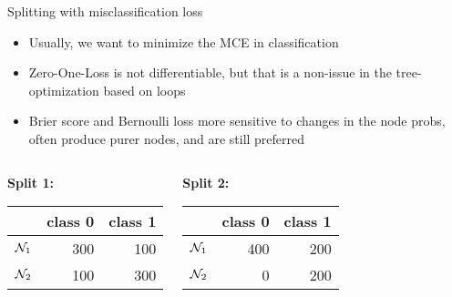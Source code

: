 \documentclass[11pt,compress,t,notes=noshow, xcolor=table]{beamer}
\begin{document}
\begin{vbframe}{Splitting with misclassification loss}

\begin{itemize}
\item Usually, we want to minimize the MCE in classification
\item Zero-One-Loss is not differentiable, but that is a non-issue in the tree-optimization based on loops
\item Brier score and Bernoulli loss more sensitive to changes in the node probs, often produce purer nodes, and are still preferred


\end{itemize}


\begin{small}
\begin{columns}[T,onlytextwidth]
\begin{center}
\textbf{Split 1:} \\
\vspace{0.25cm}
\begin{table}[ht]
\centering
\begin{tabular}{rrr}
  \hline
 & class 0 & class 1 \\ 
  \hline
$\mathcal{N}_1$ & 300 & 100 \\ 
  $\mathcal{N}_2$ & 100 & 300 \\ 
   \hline
\end{tabular}
\end{table}

\end{center}
\begin{center}
\textbf{Split 2:} \\
\vspace{0.25cm}
\begin{table}[ht]
\centering
\begin{tabular}{rrr}
  \hline
 & class 0 & class 1 \\ 
  \hline
$\mathcal{N}_1$ & 400 & 200 \\ 
  $\mathcal{N}_2$ &   0 & 200 \\ 
   \hline
\end{tabular}
\end{table}

\end{center}
\end{columns}
\end{small}


\end{vbframe}
\end{document}
